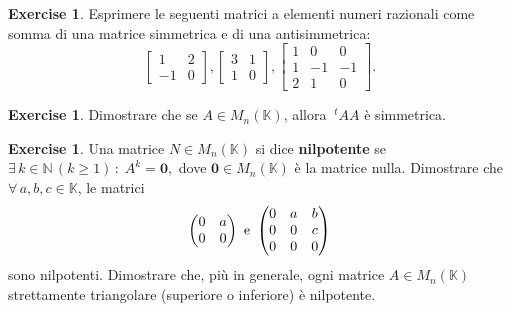 \documentclass{article}
\theoremstyle{plain}
\theoremstyle{definition}
\newtheorem{xca}[exmp]{Exercise}
\theoremstyle{remark}
\begin{document}
\begin{bxthm}
\begin{xca}
    Esprimere le seguenti matrici a elementi numeri razionali come somma di una matrice simmetrica e di una antisimmetrica:
    \[\begin{bmatrix}
        1&2\\
        -1&0
    \end{bmatrix}, \begin{bmatrix}
        3&1\\
        1&0
    \end{bmatrix},\begin{bmatrix}
        1&0&0\\
        1&-1&-1\\
        2&1&0
    \end{bmatrix}.\]
\end{xca}
\end{bxthm}

\vspace{10pt}

\begin{bxthm}
\begin{xca}
    Dimostrare che se $A\in M_n(\mathbb{K})$, allora $\ ^{t}AA$ è simmetrica.
\end{xca}
\end{bxthm}

\vspace{10pt}

\begin{bxthm}
\begin{xca}
Una matrice $N\in M_n(\mathbb{K})$ si dice \textbf{nilpotente} se \(\exists\,k\in\mathbb{N}\,(k\geq1)\,:\;A^k=\mathbf{0},\)
dove $\mathbf{0}\in M_n(\mathbb{K})$ è la matrice nulla. Dimostrare che $\forall\,a,b,c\in\mathbb{K}$, le matrici 
\[\begin{pmatrix}
    0&a\\
    0&0
\end{pmatrix}\textup{ e }
\begin{pmatrix}
    0&a&b\\
    0&0&c\\
    0&0&0
\end{pmatrix}\]
sono nilpotenti. Dimostrare che, più in generale, ogni matrice $A\in M_n(\mathbb{K})$ strettamente triangolare (superiore o inferiore) è nilpotente.
\end{xca}
\end{bxthm}

\vspace{10pt}
\end{document}
